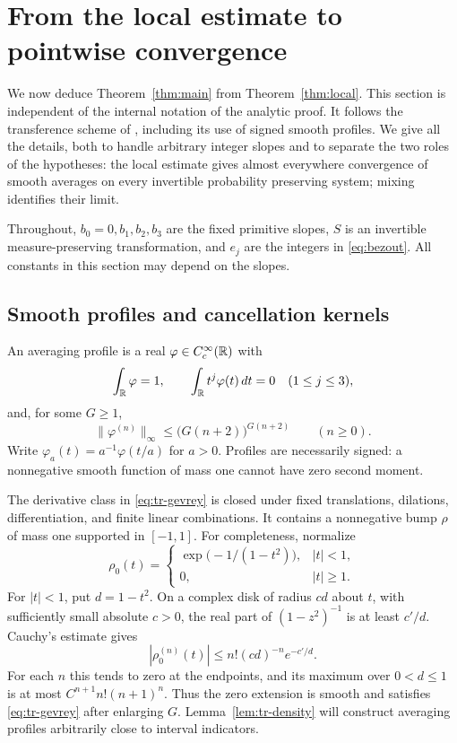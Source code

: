 \section{From the local estimate to pointwise convergence}
\label{sec:transfer}

We now deduce Theorem~\ref{thm:main} from Theorem~\ref{thm:local}.
This section is independent of the internal notation of the analytic
proof.  It follows the transference scheme of
\cite[Sections~2--3]{V}, including its use of signed smooth profiles.
We give all the details, both to handle arbitrary integer slopes and to
separate the two roles of the hypotheses: the local estimate gives
almost everywhere convergence of smooth averages on every invertible
probability preserving system; mixing identifies their limit.

Throughout, \(b_0=0,b_1,b_2,b_3\) are the fixed primitive slopes,
\(S\) is an invertible measure-preserving transformation, and
\(e_j\) are the integers in \eqref{eq:bezout}.  All constants in
this section may depend on the slopes.

\subsection{Smooth profiles and cancellation kernels}

\begin{definition}
\label{def:tr-profile}
An averaging profile is a real \(\varphi\in C_c^\infty(\mathbb R)\) with
\begin{equation}
 \int_\mathbb R\varphi=1,
 \qquad \int_\mathbb R t^j\varphi(t)\,dt=0\quad(1\leq j\leq3),
 \label{eq:tr-moments}
\end{equation}
and, for some \(G\geq1\),
\begin{equation}
 \|\varphi^{(n)}\|_\infty
 \leq \bigl(G(n+2)\bigr)^{G(n+2)}\qquad(n\geq0).
 \label{eq:tr-gevrey}
\end{equation}
Write \(\varphi_a(t)=a^{-1}\varphi(t/a)\) for \(a>0\).
Profiles are necessarily signed: a nonnegative smooth function of
mass one cannot have zero second moment.
\end{definition}

The derivative class in \eqref{eq:tr-gevrey} is closed under fixed
translations, dilations, differentiation, and finite linear combinations.
It contains a nonnegative bump \(\rho\) of mass one supported in
\([-1,1]\).  For completeness, normalize
\[
 \rho_0(t)=
 \begin{cases}
  \exp\bigl(-1/(1-t^2)\bigr),& |t|<1,\\
  0,& |t|\geq1.
 \end{cases}
\]
For \(|t|<1\), put \(d=1-t^2\).  On a complex disk of radius \(cd\)
about \(t\), with sufficiently small absolute \(c>0\), the real part
of \((1-z^2)^{-1}\) is at least \(c'/d\).  Cauchy's estimate gives
\[
 |\rho_0^{(n)}(t)|\leq n!(cd)^{-n}e^{-c'/d}.
\]
For each \(n\) this tends to zero at the endpoints, and its maximum
over \(0<d\leq1\) is at most \(C^{n+1}n!(n+1)^n\).  Thus the zero
extension is smooth and satisfies \eqref{eq:tr-gevrey} after enlarging
\(G\).  Lemma~\ref{lem:tr-density} will construct averaging profiles
arbitrarily close to interval indicators.

